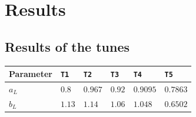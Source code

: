 \documentclass[aps,preprint,floatfix,nofootinbib,showpacs]{revtex4-1}
\begin{document}
\section{Results}
\subsection{Results of the tunes}

 \begin{table}[!h]
  \begin{center}
   \begin{tabular}{l|l|l|l|l|l}
    \hline \hline
    Parameter  & \hspace{1cm} \texttt{T1} \hspace{0.5cm} & \hspace{1cm} \texttt{T2} \hspace{0.5cm} & \hspace{1cm} \texttt{T3} \hspace{0.5cm}& \hspace{1cm} \texttt{T4} \hspace{0.5cm} & \hspace{1cm} \texttt{T5} \hspace{0.5cm}  \\ \hline
    $a_L$      & \hspace{1cm} $0.8$  \hspace{0.5cm}    & \hspace{1cm} $0.967$ \hspace{0.5cm} & \hspace{1cm} $0.92$ \hspace{0.5cm} & \hspace{1cm} $0.9095$ \hspace{0.5cm} & \hspace{1cm} $0.7863$ \hspace{0.5cm} \\ \hline
    $b_L$      & \hspace{1cm} $1.13$ \hspace{0.5cm}     & \hspace{1cm}  $1.14$ \hspace{0.5cm} & \hspace{1cm} $1.06$ \hspace{0.5cm} & \hspace{1cm} $1.048$ \hspace{0.5cm} & \hspace{1cm} $0.6502$ \hspace{0.5cm} \\ \hline

\end{tabular}
\end{center}
\end{table}
\end{document}
